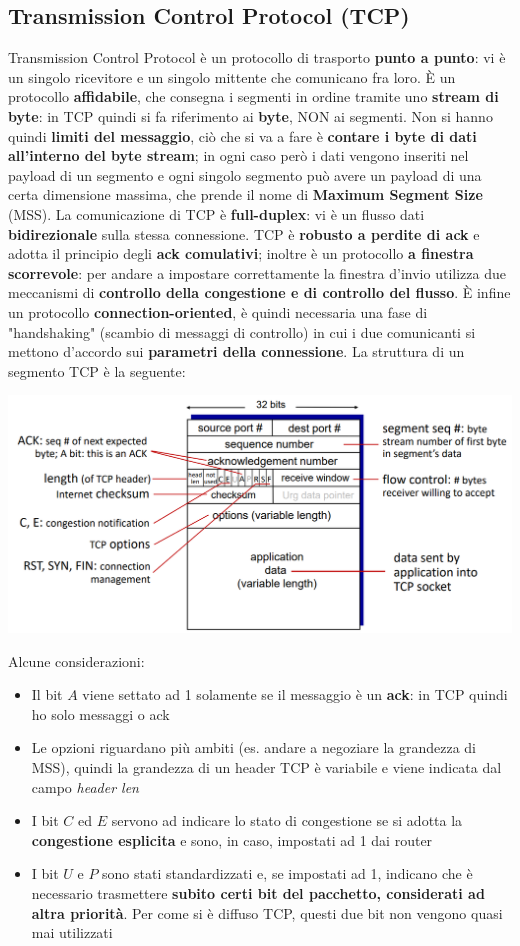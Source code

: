 \documentclass[12pt]{article}
\begin{document}
\subsection{Transmission Control Protocol (TCP)}
Transmission Control Protocol è un protocollo di trasporto \textbf{punto a punto}: vi è un singolo ricevitore e un singolo mittente che comunicano fra loro.
È un protocollo \textbf{affidabile}, che consegna i segmenti in ordine tramite uno \textbf{stream di byte}: in TCP quindi si fa riferimento ai \textbf{byte}, NON ai segmenti.
Non si hanno quindi \textbf{limiti del messaggio}, ciò che si va a fare è \textbf{contare i byte di dati all'interno del byte stream}; in ogni caso però i dati vengono inseriti nel
payload di un segmento e ogni singolo segmento può avere un payload di una certa dimensione massima, che prende il nome di \textbf{Maximum Segment Size} (MSS).
La comunicazione di TCP è \textbf{full-duplex}: vi è un flusso dati \textbf{bidirezionale} sulla stessa connessione.
TCP è \textbf{robusto a perdite di ack} e adotta il principio degli \textbf{ack comulativi}; inoltre è un protocollo \textbf{a finestra scorrevole}: per andare a impostare correttamente
la finestra d'invio utilizza due meccanismi di \textbf{controllo della congestione e di controllo del flusso}. È infine un protocollo \textbf{connection-oriented}, è quindi necessaria una fase
di "handshaking" (scambio di messaggi di controllo) in cui i due comunicanti si mettono d'accordo sui \textbf{parametri della connessione}.
La struttura di un segmento TCP è la seguente:
\begin{center}
    \includegraphics[width = 1\linewidth]{Images/56.png}
\end{center}
Alcune considerazioni:
\begin{itemize}
    \item Il bit $A$ viene settato ad 1 solamente se il messaggio è un \textbf{ack}: in TCP quindi ho solo messaggi o ack
    \item Le opzioni riguardano più ambiti (es. andare a negoziare la grandezza di MSS), quindi la grandezza di un header TCP è variabile e viene indicata dal campo \textit{header len}
    \item I bit $C$ ed $E$ servono ad indicare lo stato di congestione se si adotta la \textbf{congestione esplicita} e sono, in caso, impostati ad 1 dai router
    \item I bit $U$ e $P$ sono stati standardizzati e, se impostati ad 1, indicano che è necessario trasmettere \textbf{subito certi bit del pacchetto, considerati ad altra priorità}. Per come si è diffuso TCP, questi due bit non vengono quasi mai utilizzati
\end{itemize}
\end{document}
